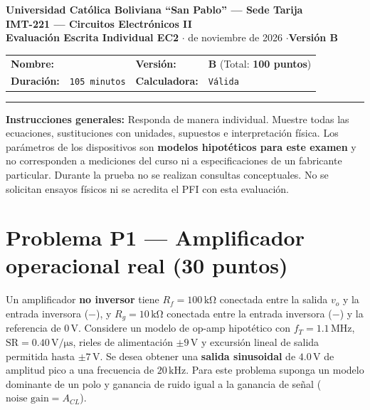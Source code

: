 \documentclass[10pt, a4paper]{article}
\begin{document}
\begin{center}
    {\large\textbf{\textcolor{ucbblue}{Universidad Católica Boliviana ``San Pablo'' --- Sede Tarija}}}\\[0.08cm]
    {\Large\textbf{IMT-221 --- Circuitos Electrónicos II}}\\
    {\normalsize\textbf{Evaluación Escrita Individual EC2} \quad$\cdot$ de noviembre de 2026 \quad$\cdot$\quad \textbf{Versión B}}
\end{center}

\begin{tcolorbox}[colback=neutralbg, colframe=ucbblue, boxrule=0.8pt, arc=1.5mm, left=6pt, right=6pt, top=5pt, bottom=5pt]
    \small
    \renewcommand{\arraystretch}{1.45}
    \begin{tabularx}{\textwidth}{@{}lX lX@{}}
        \textbf{Nombre:} & \hrulefill & \textbf{Versión:} & \textbf{B} \quad (Total: \textbf{100 puntos}) \\
        \textbf{Duración:} & \texttt{105 minutos} & \textbf{Calculadora:} & \texttt{Válida} \\
    \end{tabularx}
    \vspace{0.15cm}
    \hrule
    \vspace{0.15cm}
    \footnotesize
    \textbf{Instrucciones generales:} Responda de manera individual. Muestre todas las ecuaciones, sustituciones con unidades, supuestos e interpretación física. Los parámetros de los dispositivos son \textbf{modelos hipotéticos para este examen} y no corresponden a mediciones del curso ni a especificaciones de un fabricante particular. Durante la prueba no se realizan consultas conceptuales. No se solicitan ensayos físicos ni se acredita el PFI con esta evaluación.
\end{tcolorbox}

\section*{Problema P1 --- Amplificador operacional real (30 puntos)}

Un amplificador \textbf{no inversor} tiene $R_f = 100\,\mathrm{k\Omega}$ conectada entre la salida $v_o$ y la entrada inversora ($-$), y $R_g = 10\,\mathrm{k\Omega}$ conectada entre la entrada inversora ($-$) y la referencia de $0\,\mathrm{V}$. Considere un modelo de op-amp hipotético con $f_T = 1.1\,\mathrm{MHz}$, $\mathrm{SR} = 0.40\,\mathrm{V/\mu s}$, rieles de alimentación $\pm 9\,\mathrm{V}$ y excursión lineal de salida permitida hasta $\pm 7\,\mathrm{V}$. Se desea obtener una \textbf{salida sinusoidal} de $4.0\,\mathrm{V}$ de amplitud pico a una frecuencia de $20\,\mathrm{kHz}$. Para este problema suponga un modelo dominante de un polo y ganancia de ruido igual a la ganancia de señal ($\text{noise gain} = A_{CL}$).
\end{document}
